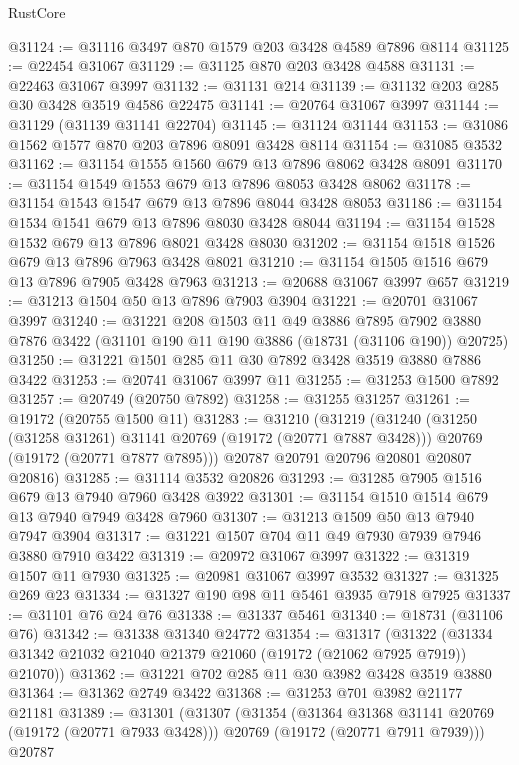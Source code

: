 \begin{lexlean}{RustCore}
\begin{coremodule}
@31124 := @31116 @3497 @870 @1579 @203 @3428 @4589 @7896 @8114
@31125 := @22454 @31067
@31129 := @31125 @870 @203 @3428 @4588
@31131 := @22463 @31067 @3997
@31132 := @31131 @214
@31139 := @31132 @203 @285 @30 @3428 @3519 @4586 @22475
@31141 := @20764 @31067 @3997
@31144 := @31129 (@31139 @31141 @22704)
@31145 := @31124 @31144
@31153 := @31086 @1562 @1577 @870 @203 @7896 @8091 @3428 @8114
@31154 := @31085 @3532
@31162 := @31154 @1555 @1560 @679 @13 @7896 @8062 @3428 @8091
@31170 := @31154 @1549 @1553 @679 @13 @7896 @8053 @3428 @8062
@31178 := @31154 @1543 @1547 @679 @13 @7896 @8044 @3428 @8053
@31186 := @31154 @1534 @1541 @679 @13 @7896 @8030 @3428 @8044
@31194 := @31154 @1528 @1532 @679 @13 @7896 @8021 @3428 @8030
@31202 := @31154 @1518 @1526 @679 @13 @7896 @7963 @3428 @8021
@31210 := @31154 @1505 @1516 @679 @13 @7896 @7905 @3428 @7963
@31213 := @20688 @31067 @3997 @657
@31219 := @31213 @1504 @50 @13 @7896 @7903 @3904
@31221 := @20701 @31067 @3997
@31240 := @31221
    @208
    @1503
    @11
    @49
    @3886
    @7895
    @7902
    @3880
    @7876
    @3422
    (@31101 @190 @11 @190 @3886 (@18731 (@31106 @190)) @20725)
@31250 := @31221 @1501 @285 @11 @30 @7892 @3428 @3519 @3880 @7886 @3422
@31253 := @20741 @31067 @3997 @11
@31255 := @31253 @1500 @7892
@31257 := @20749 (@20750 @7892)
@31258 := @31255 @31257
@31261 := @19172 (@20755 @1500 @11)
@31283 := @31210
    (@31219
      (@31240
        (@31250 (@31258 @31261) @31141 @20769 (@19172 (@20771 @7887 @3428)))
        @20769
        (@19172 (@20771 @7877 @7895)))
      @20787
      @20791
      @20796
      @20801
      @20807
      @20816)
@31285 := @31114 @3532 @20826
@31293 := @31285 @7905 @1516 @679 @13 @7940 @7960 @3428 @3922
@31301 := @31154 @1510 @1514 @679 @13 @7940 @7949 @3428 @7960
@31307 := @31213 @1509 @50 @13 @7940 @7947 @3904
@31317 := @31221 @1507 @704 @11 @49 @7930 @7939 @7946 @3880 @7910 @3422
@31319 := @20972 @31067 @3997
@31322 := @31319 @1507 @11 @7930
@31325 := @20981 @31067 @3997 @3532
@31327 := @31325 @269 @23
@31334 := @31327 @190 @98 @11 @5461 @3935 @7918 @7925
@31337 := @31101 @76 @24 @76
@31338 := @31337 @5461
@31340 := @18731 (@31106 @76)
@31342 := @31338 @31340 @24772
@31354 := @31317
    (@31322 (@31334 @31342 @21032 @21040 @21379 @21060 (@19172 (@21062 @7925 @7919)) @21070))
@31362 := @31221 @702 @285 @11 @30 @3982 @3428 @3519 @3880
@31364 := @31362 @2749 @3422
@31368 := @31253 @701 @3982 @21177 @21181
@31389 := @31301
    (@31307
      (@31354
        (@31364 @31368 @31141 @20769 (@19172 (@20771 @7933 @3428)))
        @20769
        (@19172 (@20771 @7911 @7939)))
      @20787

\end{coremodule}
\end{lexlean}

